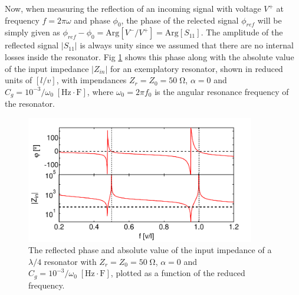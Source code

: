 %
Now, when measuring the reflection of an incoming signal with voltage $V^+$ at frequency $f=2\pi \omega$ and phase $\phi_0$, the phase of the relected signal $\phi_{ref}$ will be simply given as $\phi_{ref}-\phi_0=\mathrm{Arg}[V^-/V^+] = \mathrm{Arg}[S_{11}]$. The amplitude of the reflected signal $|S_{11}|$ is always unity since we assumed that there are no internal losses inside the resonator. Fig \ref{fig:lambda_over_4_response} shows this phase along with the absolute value of the input impedance $|Z_{in}|$ for an exemplatory resonator, shown in reduced units of $[l/v]$, with impendances $Z_r=Z_0=50\;\mathrm{\Omega}$, $\alpha=0$ and $C_g=10^{-3}/\omega_0\;[\mathrm{Hz}\cdot \mathrm{F}]$, where $\omega_0 = 2\pi f_0$ is the angular resonance frequency of the resonator.

\begin{figure}
	\includegraphics[width=10cm]{"./material/mathematica/cpw_lambda_over_4_phase_and_z"}
	\caption{The reflected phase and absolute value of the input impedance of a $\lambda/4$ resonator with $Z_r=Z_0=50\;\mathrm{\Omega}$, $\alpha=0$ and $C_g=10^{-3}/\omega_0\;[\mathrm{Hz}\cdot\mathrm{F}]$, plotted as a function of the reduced frequency.}
	\label{fig:lambda_over_4_response}
\end{figure}

